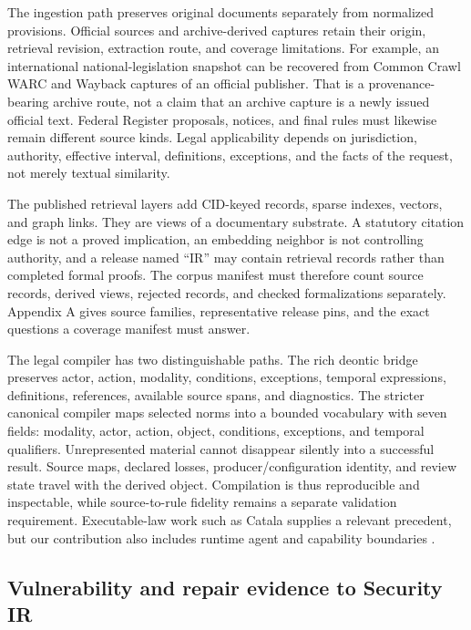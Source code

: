 \documentclass{article}
\begin{document}
The ingestion path preserves original documents separately from normalized provisions. Official sources and archive-derived captures retain their origin, retrieval revision, extraction route, and coverage limitations. For example, an international national-legislation snapshot can be recovered from Common Crawl WARC and Wayback captures of an official publisher. That is a provenance-bearing archive route, not a claim that an archive capture is a newly issued official text. Federal Register proposals, notices, and final rules must likewise remain different source kinds. Legal applicability depends on jurisdiction, authority, effective interval, definitions, exceptions, and the facts of the request, not merely textual similarity.

The published retrieval layers add CID-keyed records, sparse indexes, vectors, and graph links. They are views of a documentary substrate. A statutory citation edge is not a proved implication, an embedding neighbor is not controlling authority, and a release named ``IR'' may contain retrieval records rather than completed formal proofs. The corpus manifest must therefore count source records, derived views, rejected records, and checked formalizations separately. Appendix A gives source families, representative release pins, and the exact questions a coverage manifest must answer.

The legal compiler has two distinguishable paths. The rich deontic bridge preserves actor, action, modality, conditions, exceptions, temporal expressions, definitions, references, available source spans, and diagnostics. The stricter canonical compiler maps selected norms into a bounded vocabulary with seven fields: modality, actor, action, object, conditions, exceptions, and temporal qualifiers. Unrepresented material cannot disappear silently into a successful result. Source maps, declared losses, producer/configuration identity, and review state travel with the derived object. Compilation is thus reproducible and inspectable, while source-to-rule fidelity remains a separate validation requirement. Executable-law work such as Catala supplies a relevant precedent, but our contribution also includes runtime agent and capability boundaries \citep{catala}.

\subsection{Vulnerability and repair evidence to Security IR}
\end{document}
